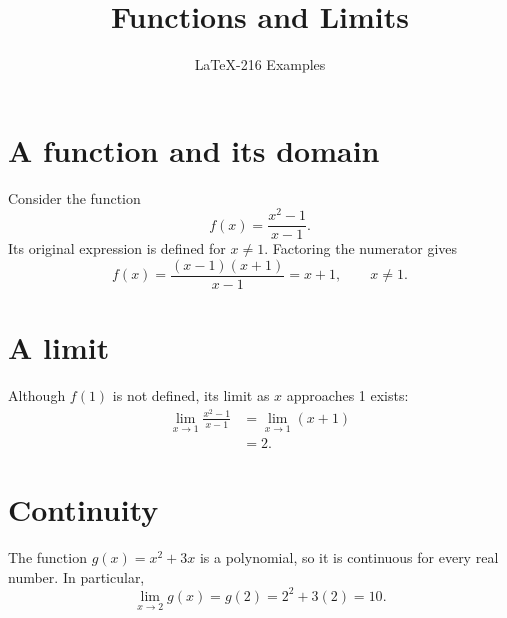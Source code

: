 \documentclass{article}
\title{Functions and Limits}
\author{LaTeX-216 Examples}
\date{}
\begin{document}
\maketitle

\section{A function and its domain}
Consider the function
\[
  f(x) = \frac{x^2 - 1}{x - 1}.
\]
Its original expression is defined for $x \ne 1$. Factoring the numerator gives
\[
  f(x) = \frac{(x-1)(x+1)}{x-1} = x+1, \qquad x \ne 1.
\]

\section{A limit}
Although $f(1)$ is not defined, its limit as $x$ approaches 1 exists:
\begin{align*}
  \lim_{x \to 1} \frac{x^2 - 1}{x - 1}
    &= \lim_{x \to 1} (x+1) \\
    &= 2.
\end{align*}

\section{Continuity}
The function $g(x)=x^2+3x$ is a polynomial, so it is continuous for every real
number. In particular,
\[
  \lim_{x \to 2} g(x) = g(2) = 2^2 + 3(2) = 10.
\]
\end{document}
